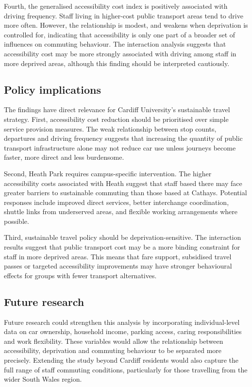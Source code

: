 \documentclass[11pt,a4paper]{article}
\begin{document}
Fourth, the generalised accessibility cost index is positively associated with driving frequency. Staff living in higher-cost public transport areas tend to drive more often. However, the relationship is modest, and weakens when deprivation is controlled for, indicating that accessibility is only one part of a broader set of influences on commuting behaviour. The interaction analysis suggests that accessibility cost may be more strongly associated with driving among staff in more deprived areas, although this finding should be interpreted cautiously.

\subsection{Policy implications}

The findings have direct relevance for Cardiff University's sustainable travel strategy. First, accessibility cost reduction should be prioritised over simple service provision measures. The weak relationship between stop counts, departures and driving frequency suggests that increasing the quantity of public transport infrastructure alone may not reduce car use unless journeys become faster, more direct and less burdensome.

Second, Heath Park requires campus-specific intervention. The higher accessibility costs associated with Heath suggest that staff based there may face greater barriers to sustainable commuting than those based at Cathays. Potential responses include improved direct services, better interchange coordination, shuttle links from underserved areas, and flexible working arrangements where possible.

Third, sustainable travel policy should be deprivation-sensitive. The interaction results suggest that public transport cost may be a more binding constraint for staff in more deprived areas. This means that fare support, subsidised travel passes or targeted accessibility improvements may have stronger behavioural effects for groups with fewer transport alternatives.

\subsection{Future research}

Future research could strengthen this analysis by incorporating individual-level data on car ownership, household income, parking access, caring responsibilities and work flexibility. These variables would allow the relationship between accessibility, deprivation and commuting behaviour to be separated more precisely. Extending the study beyond Cardiff residents would also capture the full range of staff commuting conditions, particularly for those travelling from the wider South Wales region.
\end{document}
